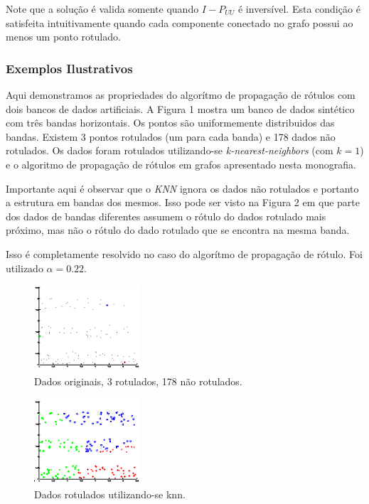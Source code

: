 \documentclass[12pt]{article}
\begin{document}
Note que a solução é valida somente quando $I - P_{UU}$ é inversível. Esta condição é satisfeita intuitivamente quando cada componente conectado no grafo possui ao menos um ponto rotulado.

\subsubsection{Exemplos Ilustrativos}
Aqui demonstramos as propriedades do algorítmo de propagação de rótulos com dois bancos de dados artificiais. A Figura 1 mostra um banco de dados sintético com três bandas horizontais. Os pontos são uniformemente distribuidos das bandas. Existem 3 pontos rotulados (um para cada banda) e 178 dados não rotulados. Os dados foram rotulados utilizando-se \emph{k-nearest-neighbors} (com $k=1$) e o algoritmo de propagação de rótulos em grafos apresentado nesta monografia. 

Importante aqui é observar que o \emph{KNN} ignora os dados não rotulados e portanto a estrutura em bandas dos mesmos. Isso pode ser visto na Figura 2 em que parte dos dados de bandas diferentes assumem o rótulo do dados rotulado mais próximo, mas não o rótulo do dado rotulado que se encontra na mesma banda.

Isso é completamente resolvido no caso do algorítmo de propagação de rótulo. Foi utilizado $\alpha = 0.22$.

\begin{figure}[!h] \label{fig:horizontal1}
        \begin{center}
                \includegraphics[width=0.35\textwidth]{prop1-dados}
        \end{center}
        \caption{Dados originais, 3 rotulados, 178 não rotulados.}
\end{figure}

\begin{figure}[!h] \label{fig:horizontal2}
        \begin{center}
                \includegraphics[width=0.35\textwidth]{prop1-dados-knn}
        \end{center}
        \caption{Dados rotulados utilizando-se knn.}
\end{figure}
\end{document}

